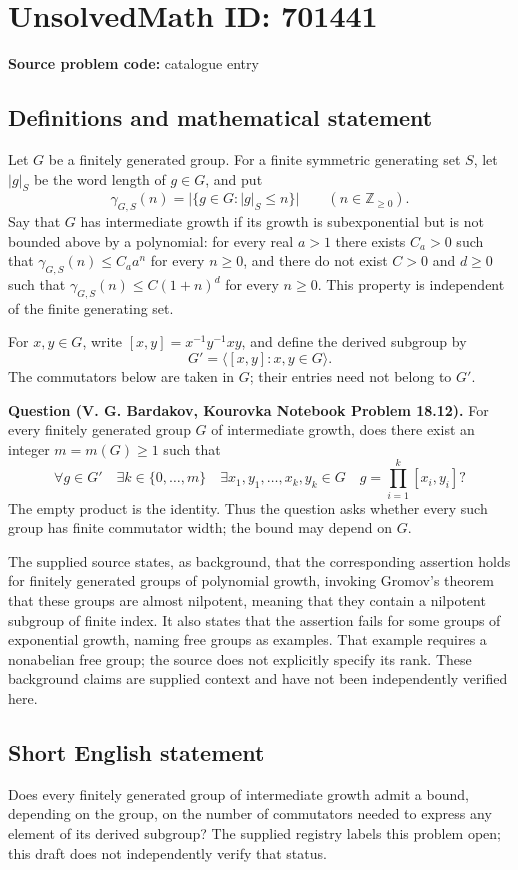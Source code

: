 \documentclass[11pt]{article}
\newcommand{\Z}{\mathbb{Z}}
\begin{document}
\section*{UnsolvedMath ID: 701441}
\textbf{Source problem code:} catalogue entry
\subsection{Definitions and mathematical statement}
Let \(G\) be a finitely generated group. For a finite symmetric generating set \(S\), let \(|g|_S\) be the word length of \(g\in G\), and put
\[
\gamma_{G,S}(n)=\bigl|\{g\in G:|g|_S\le n\}\bigr|\qquad(n\in\Z_{\ge0}).
\]
Say that \(G\) has intermediate growth if its growth is subexponential but is not bounded above by a polynomial: for every real \(a>1\) there exists \(C_a>0\) such that \(\gamma_{G,S}(n)\le C_a a^n\) for every \(n\ge0\), and there do not exist \(C>0\) and \(d\ge0\) such that \(\gamma_{G,S}(n)\le C(1+n)^d\) for every \(n\ge0\). This property is independent of the finite generating set.

For \(x,y\in G\), write \([x,y]=x^{-1}y^{-1}xy\), and define the derived subgroup by
\[
G'=\langle [x,y]:x,y\in G\rangle.
\]
The commutators below are taken in \(G\); their entries need not belong to \(G'\).

\textbf{Question (V. G. Bardakov, Kourovka Notebook Problem 18.12).} For every finitely generated group \(G\) of intermediate growth, does there exist an integer \(m=m(G)\ge1\) such that
\[
\forall g\in G'\quad
\exists k\in\{0,\ldots,m\}\quad
\exists x_1,y_1,\ldots,x_k,y_k\in G
\quad
 g=\prod_{i=1}^{k}[x_i,y_i]?
\]
The empty product is the identity. Thus the question asks whether every such group has finite commutator width; the bound may depend on \(G\).

The supplied source states, as background, that the corresponding assertion holds for finitely generated groups of polynomial growth, invoking Gromov's theorem that these groups are almost nilpotent, meaning that they contain a nilpotent subgroup of finite index. It also states that the assertion fails for some groups of exponential growth, naming free groups as examples. That example requires a nonabelian free group; the source does not explicitly specify its rank. These background claims are supplied context and have not been independently verified here.
\subsection{Short English statement}
Does every finitely generated group of intermediate growth admit a bound, depending on the group, on the number of commutators needed to express any element of its derived subgroup? The supplied registry labels this problem open; this draft does not independently verify that status.
\end{document}
